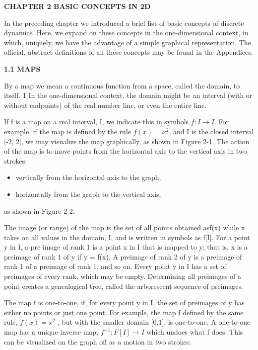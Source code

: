 \documentclass[12pt]{article}
\begin{document}
\textbf{CHAPTER 2
BASIC CONCEPTS IN 2D}

\hfill 

In the preceding chapter we introduced a brief list of basic concepts
of discrete dynamics. Here, we expand on these concepts in
the one-dimensional context, in which, uniquely, we have the
advantage of a simple graphical representation. The official,
abstract definitions of all these concepts may be found in the
Appendices.

\hfill

\textbf{1.1 MAPS}

\hfill

By a map we mean a continuous function from a space, called
the domain, to itself. 1 In the one-dimensional context, the domain
might be an interval (with or without endpoints) of the real number
line, or even the entire line.

\hfill

If f is a map on a real interval, I, we indicate this in symbols
$f:I \to I$. For example, if the map is defined by the rule $f(x) = x^2$,
and I is the closed interval [-2, 2], we may visualize the map graphically,
as shown in Figure 2-1. The action of the map is to move
points from the horizontal axis to the vertical axis in two strokes:

\begin{itemize}
\item vertically from the horizontal axis to the graph,
\item horizontally from the graph to the vertical axis,
\end{itemize}

as shown in Figure 2-2.

\hfill


The image (or range) of the map is the set of all points obtained
asf(x) while x takes on all values in the domain, I, and is written in
symbols as f[I]. For a point y in I, a pre image of rank 1 is a point x 
in I that is mapped to y; that is, x is a preimage of rank 1 of y if y =
f(x). A preimage of rank 2 of y is a preimage of rank 1 of a preimage
of rank 1, and so on. Every point y in I has a set of preimages of
every rank, which may be empty. Determining all preimages of a
point creates a genealogical tree, called the arborescent sequence of
preimages.

\hfill

The map f is one-to-one, if, for every point y in I, the set of preimages
of y has either no points or just one point. For example, the
map f defined by the same rule, $f(x) = x^2$ , but with the smaller
domain [0,1], is one-to-one. A one-to-one map has a unique inverse
map, $f^{-1}: F[I] \to I$ which undoes what f does. This can be visualized
on the graph off as a motion in two strokes:
\end{document}
